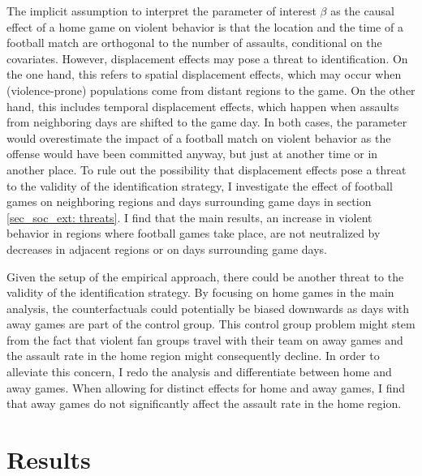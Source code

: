 The implicit assumption to interpret the parameter of interest $\beta$ as the causal effect of a home game on violent behavior is that the location and the time of a football match are orthogonal to the number of assaults, conditional on the covariates. However, displacement effects may pose a threat to identification. On the one hand, this refers to spatial displacement effects, which may occur when (violence-prone) populations come from distant regions to the game. On the other hand, this includes temporal displacement effects, which happen when assaults from neighboring days are shifted to the game day. In both cases, the parameter would overestimate the impact of a football match on violent behavior as the offense would have been committed anyway, but just at another time or in another place. To rule out the possibility that displacement effects pose a threat to the validity of the identification strategy, I investigate the effect of football games on neighboring regions and days surrounding game days in section \ref{sec_soc_ext: threats}. I find that the main results, an increase in violent behavior in regions where football games take place, are not neutralized by decreases in adjacent regions or on days surrounding game days.


Given the setup of the empirical approach, there could be another threat to the validity of the identification strategy. By focusing on home games in the main analysis, the counterfactuals could potentially be biased downwards as days with away games are part of the control group. This control group problem might stem from the fact that violent fan groups travel with their team on away games and the assault rate in the home region might consequently decline. In order to alleviate this concern, I redo the analysis and differentiate between home and away games. When allowing for distinct effects for home and away games, I find that away games do not significantly affect the assault rate in the home region. 









\bigskip
\section{Results}\label{sec_soc_ext:results}



